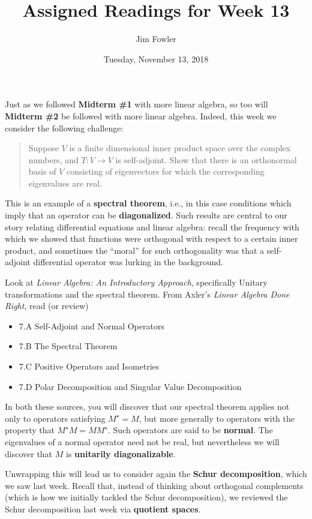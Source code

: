 \documentclass{homework}
\author{Jim Fowler}
\title{Assigned Readings for Week 13}
\date{Tuesday, November 13, 2018}
\begin{document}
\maketitle

Just as we followed \textbf{Midterm \#1} with more linear algebra, so
too will \textbf{Midterm \#2} be followed with more linear algebra.
Indeed, this week we consider the following challenge:
\begin{quote}
  Suppose $V$ is a finite dimensional inner product space over the
  complex numbers, and $T : V \to V$ is self-adjoint.  Show that there
  is an orthonormal basis of $V$ consisting of eigenvectors for which
  the corresponding eigenvalues are real.
\end{quote}
This is an example of a \textbf{spectral theorem}, i.e., in this case
conditions which imply that an operator can be \textbf{diagonalized}.
Such results are central to our story relating differential
equations and linear algebra: recall the frequency with which we
showed that functions were orthogonal with respect to a certain inner
product, and sometimes the ``moral'' for such orthogonality was that a
self-adjoint differential operator was lurking in the background.

Look at \textit{Linear Algebra: An
  Introductory Approach}, specifically  Unitary transformations and the spectral theorem.
From Axler's \textit{Linear Algebra Done Right}, read (or review)
\begin{itemize}
\item \textsection 7.A Self-Adjoint and Normal Operators
\item \textsection 7.B The Spectral Theorem
\item \textsection 7.C Positive Operators and Isometries
\item \textsection 7.D Polar Decomposition and Singular Value Decomposition
\end{itemize}

In both these sources, you will discover that our spectral theorem
applies not only to operators satisfying $M^\star = M$, but more
generally to operators with the property that $M^\star M = M M^\star$.
Such operators are said to be \textbf{normal}.  The eigenvalues of a
normal operator need not be real, but nevertheless we will discover
that $M$ is \textbf{unitarily diagonalizable}.

Unwrapping this will lead us to consider again the \textbf{Schur
  decomposition}, which we saw last week.  Recall that, instead of
thinking about orthogonal complements (which is how we initially
tackled the Schur decomposition), we reviewed the Schur decomposition
last week via \textbf{quotient spaces}.
\end{document}
